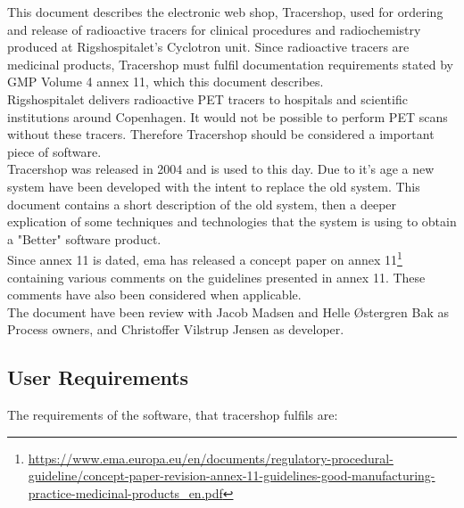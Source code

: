 \documentclass{article}
\begin{document}
This document describes the electronic web shop, Tracershop, used for ordering
and release of radioactive tracers for clinical procedures and radiochemistry
produced at Rigshospitalet's Cyclotron unit. Since radioactive tracers are
medicinal products, Tracershop must fulfil documentation requirements stated by
GMP Volume 4 annex 11, which this document describes.\\
Rigshospitalet delivers radioactive PET tracers to hospitals and scientific
institutions around Copenhagen. It would not be possible to perform PET scans
without these tracers. Therefore Tracershop should be considered a important
piece of software.\\
Tracershop was released in 2004 and is used to this day. Due to it's age a new
system have been developed with the intent to replace the old system. This
document contains a short description of the old system, then a deeper
explication of some techniques and technologies that the system is using to
obtain a "Better" software product.\\
Since annex 11 is dated, \gls*{ema} has released a concept paper on annex 11\footnote{
\url{https://www.ema.europa.eu/en/documents/regulatory-procedural-guideline/concept-paper-revision-annex-11-guidelines-good-manufacturing-practice-medicinal-products_en.pdf}}
containing various comments on the guidelines presented in annex 11.
These comments have also been considered when applicable. \\
The document have been review with Jacob Madsen and Helle Østergren Bak as
Process owners, and Christoffer Vilstrup Jensen as developer.

\subsection*{User Requirements}

The requirements of the software, that tracershop fulfils are:
\end{document}
